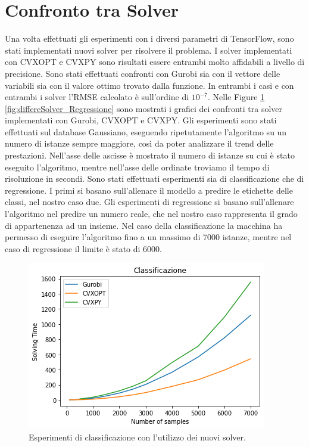 \documentclass[a4paper,12pt]{report}
\begin{document}
\section{Confronto tra Solver}
Una volta effettuati gli esperimenti con i diversi parametri di TensorFlow, sono stati implementati nuovi solver per risolvere il problema. I solver implementati con CVXOPT e CVXPY sono risultati essere entrambi molto affidabili a livello di precisione. Sono stati effettuati confronti con Gurobi sia con il vettore delle variabili sia con il valore ottimo trovato dalla funzione. In entrambi i casi e con entrambi i solver l'RMSE calcolato è sull'ordine di $10^{-7}$. Nelle Figure \ref{fig:differeSolver_Classification} \ref{fig:differeSolver_Regressione} sono mostrati i grafici dei confronti tra solver implementati con Gurobi, CVXOPT e CVXPY. Gli esperimenti sono stati effettuati sul database Gaussiano, eseguendo ripetutamente l'algoritmo su un numero di istanze sempre maggiore, così da poter analizzare il trend delle prestazioni. Nell'asse delle ascisse è mostrato il numero di istanze su cui è stato eseguito l'algoritmo, mentre nell'asse delle ordinate troviamo il tempo di risoluzione in secondi. Sono stati effettuati esperimenti sia di classificazione che di regressione. I primi si basano sull'allenare il modello a predire le etichette delle classi, nel nostro caso due. Gli esperimenti di regressione si basano sull'allenare l'algoritmo nel predire un numero reale, che nel nostro caso rappresenta il grado di appartenenza ad un insieme. Nel caso della classificazione la macchina ha permesso di eseguire l'algoritmo fino a un massimo di 7000 istanze, mentre nel caso di regressione il limite è stato di 6000.

\begin{figure}[H]
    \centering
    \includegraphics[scale=0.8]{images/Grafici/DifferentSolver_Classification.png}
    \caption{Esperimenti di classificazione con l'utilizzo dei nuovi solver.}
    \label{fig:differeSolver_Classification}
\end{figure}
\end{document}
